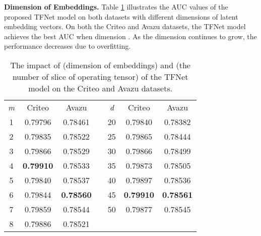 \documentclass[sigconf]{acmart}
\begin{document}
\textbf{Dimension  of Embeddings.}  Table \ref{hyper} illustrates the AUC values of the proposed TFNet model on both datasets with different dimensions  of latent embedding vectors. On both the Criteo and Avazu datasets, the TFNet model achieves the best AUC when dimension . 
As the dimension  continues to grow, the performance decreases due to overfitting. 



\begin{table}[]
\small
\centering
  \caption{The impact of  (dimension of embeddings) and  (the number of slice of operating tensor) of the TFNet model on the Criteo and Avazu datasets.}
\begin{tabular}{|c|c|c|cccc}
\cline{1-3} \cline{5-7}
\textit{m} & Criteo  & Avazu   & \multicolumn{1}{c|}{} & \multicolumn{1}{c|}{\textit{d}} & \multicolumn{1}{c|}{Criteo}  & \multicolumn{1}{c|}{Avazu}   \\ \cline{1-3} \cline{5-7} 
1          & 0.79796 & 0.78461 & \multicolumn{1}{c|}{} & \multicolumn{1}{c|}{20}         & \multicolumn{1}{c|}{0.79840} & \multicolumn{1}{c|}{0.78382} \\ \cline{1-3} \cline{5-7} 
2          & 0.79835 & 0.78522 & \multicolumn{1}{c|}{} & \multicolumn{1}{c|}{25}         & \multicolumn{1}{c|}{0.79865} & \multicolumn{1}{c|}{0.78444} \\ \cline{1-3} \cline{5-7} 
3          & 0.79866 & 0.78529 & \multicolumn{1}{c|}{} & \multicolumn{1}{c|}{30}         & \multicolumn{1}{c|}{0.79866} & \multicolumn{1}{c|}{0.78499} \\ \cline{1-3} \cline{5-7} 
4          & \textbf{0.79910} & 0.78533 & \multicolumn{1}{c|}{} & \multicolumn{1}{c|}{35}         & \multicolumn{1}{c|}{0.79873} & \multicolumn{1}{c|}{0.78505} \\ \cline{1-3} \cline{5-7} 
5          & 0.79840 & 0.78537 & \multicolumn{1}{c|}{} & \multicolumn{1}{c|}{40}         & \multicolumn{1}{c|}{0.79897} & \multicolumn{1}{c|}{0.78536} \\ \cline{1-3} \cline{5-7} 
6          & 0.79844 & \textbf{0.78560} & \multicolumn{1}{c|}{} & \multicolumn{1}{c|}{45}         & \multicolumn{1}{c|}{\textbf{0.79910}} & \multicolumn{1}{c|}{\textbf{0.78561}} \\ \cline{1-3} \cline{5-7} 
7          & 0.79859 & 0.78544 & \multicolumn{1}{c|}{} & \multicolumn{1}{c|}{50}         & \multicolumn{1}{c|}{0.79877} & \multicolumn{1}{c|}{0.78545} \\ \cline{1-3} \cline{5-7} 
8          & 0.79886 & 0.78521 &                       &                                 &                              &                              \\ \cline{1-3}
\end{tabular}
\label{hyper}
\end{table}
\end{document}
